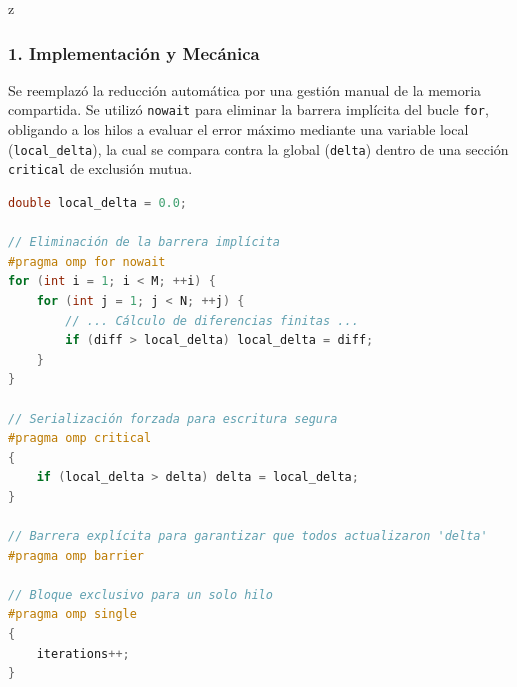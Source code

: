 z\documentclass[11pt,a4paper]{article}
\begin{document}
\subsubsection*{1. Implementación y Mecánica}
Se reemplazó la reducción automática por una gestión manual de la memoria compartida. Se utilizó \texttt{nowait} para eliminar la barrera implícita del bucle \texttt{for}, obligando a los hilos a evaluar el error máximo mediante una variable local (\texttt{local\_delta}), la cual se compara contra la global (\texttt{delta}) dentro de una sección \texttt{critical} de exclusión mutua.

\begin{lstlisting}[language=C++, caption={Gestión manual de sincronización y reducción del error.}, label={lst:act5}]
double local_delta = 0.0;

// Eliminación de la barrera implícita
#pragma omp for nowait
for (int i = 1; i < M; ++i) {
    for (int j = 1; j < N; ++j) {
        // ... Cálculo de diferencias finitas ...
        if (diff > local_delta) local_delta = diff;
    }
}

// Serialización forzada para escritura segura
#pragma omp critical
{
    if (local_delta > delta) delta = local_delta;
}

// Barrera explícita para garantizar que todos actualizaron 'delta'
#pragma omp barrier

// Bloque exclusivo para un solo hilo
#pragma omp single
{
    iterations++;
}
\end{lstlisting}
\end{document}
